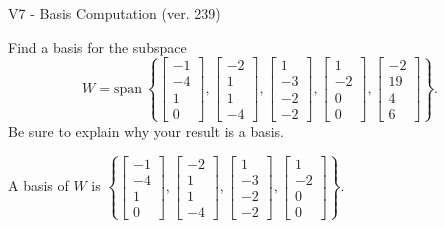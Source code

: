 \begin{exercise}
  \begin{exerciseTitle}V7 - Basis Computation (ver. 239)\end{exerciseTitle}
  \begin{exerciseStatement}
    Find a basis for the subspace 
\[W=\mathrm{span}\ \left\{\left[\begin{array}{r}
-1 \\
-4 \\
1 \\
0
\end{array}\right] , \left[\begin{array}{r}
-2 \\
1 \\
1 \\
-4
\end{array}\right] , \left[\begin{array}{r}
1 \\
-3 \\
-2 \\
-2
\end{array}\right] , \left[\begin{array}{r}
1 \\
-2 \\
0 \\
0
\end{array}\right] , \left[\begin{array}{r}
-2 \\
19 \\
4 \\
6
\end{array}\right]\right\}.\]
 Be sure to explain why your result is a basis.


  \end{exerciseStatement}
  \begin{exerciseAnswer}
   A basis of \(W\) is  \(\left\{\left[\begin{array}{r}
-1 \\
-4 \\
1 \\
0
\end{array}\right] , \left[\begin{array}{r}
-2 \\
1 \\
1 \\
-4
\end{array}\right] , \left[\begin{array}{r}
1 \\
-3 \\
-2 \\
-2
\end{array}\right] , \left[\begin{array}{r}
1 \\
-2 \\
0 \\
0
\end{array}\right]\right\}\).
  


  \end{exerciseAnswer}
\end{exercise}